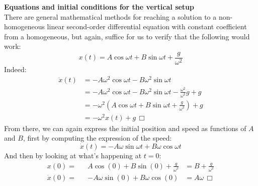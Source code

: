 \documentclass[solutions.tex]{subfiles}
\renewcommand{\qed}{\,\Box}
\begin{document}
\hr
\textbf{Equations and initial conditions for the vertical setup} \\
There are general mathematical methods for reaching a solution to a
non-homogeneous linear second-order differential equation with
constant coefficient from a homogeneous, but again, suffice for us
to verify that the following would work:
\[x(t) = A\cos\omega t + B\sin\omega t + \frac{g}{\omega^2} \]
Indeed:
\begin{align*}
	\ddot x(t) &= -A\omega^2\cos\omega t - B\omega^2\sin\omega t \\
	~ &= -A\omega^2\cos\omega t - B\omega^2\sin\omega t -\frac{\omega^2}{\omega^2}g + g\\
	~ &= -\omega^2 (A\cos\omega t + B\sin\omega t + \frac{g}{\omega^2}) + g \\
	~ &= -\omega^2 x(t) +g\qed
\end{align*}
From there, we can again express the initial position and speed
as functions of $A$ and $B$, first by computing the expression of the speed:
\[ \dot x(t) = -A\omega\sin\omega t + B\omega\cos\omega t \]
And then by looking at what's happening at $t=0$:
\begin{equation*} \begin{aligned}
	x(0) = && A\cos(0) + B\sin(0)+\frac{g}{\omega^2} &= \boxed{B+\frac{g}{\omega^2}} \\
	\dot x(0) = && -A\omega\sin(0) + B\omega\cos(0) &= \boxed{A\omega}\qed
\end{aligned} \end{equation*}

\iffalse
\hr
\textbf{Inertial mass vs. gravitational mass}
\fi
\end{document}
